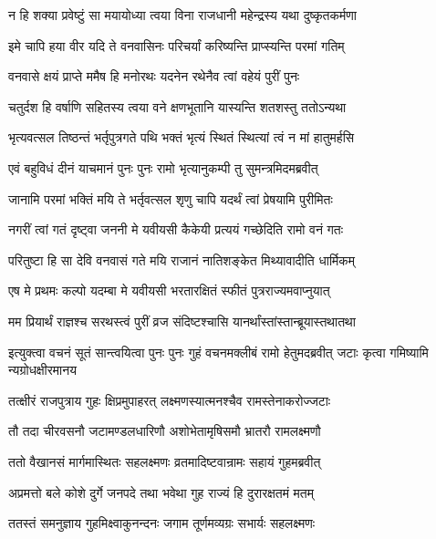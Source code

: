 \twolineshloka
{न हि शक्या प्रवेष्टुं सा मयायोध्या त्वया विना}
{राजधानी महेन्द्रस्य यथा दुष्कृतकर्मणा} %

\twolineshloka
{इमे चापि हया वीर यदि ते वनवासिनः}
{परिचर्यां करिष्यन्ति प्राप्स्यन्ति परमां गतिम्} %

\twolineshloka
{वनवासे क्षयं प्राप्ते ममैष हि मनोरथः}
{यदनेन रथेनैव त्वां वहेयं पुरीं पुनः} %

\twolineshloka
{चतुर्दश हि वर्षाणि सहितस्य त्वया वने}
{क्षणभूतानि यास्यन्ति शतशस्तु ततोऽन्यथा} %

\twolineshloka
{भृत्यवत्सल तिष्ठन्तं भर्तृपुत्रगते पथि}
{भक्तं भृत्यं स्थितं स्थित्यां त्वं न मां हातुमर्हसि} %

\twolineshloka
{एवं बहुविधं दीनं याचमानं पुनः पुनः}
{रामो भृत्यानुकम्पी तु सुमन्त्रमिदमब्रवीत्} %

\twolineshloka
{जानामि परमां भक्तिं मयि ते भर्तृवत्सल}
{शृणु चापि यदर्थं त्वां प्रेषयामि पुरीमितः} %

\twolineshloka
{नगरीं त्वां गतं दृष्ट्वा जननी मे यवीयसी}
{कैकेयी प्रत्ययं गच्छेदिति रामो वनं गतः} %

\twolineshloka
{परितुष्टा हि सा देवि वनवासं गते मयि}
{राजानं नातिशङ्केत मिथ्यावादीति धार्मिकम्} %

\twolineshloka
{एष मे प्रथमः कल्पो यदम्बा मे यवीयसी}
{भरतारक्षितं स्फीतं पुत्रराज्यमवाप्नुयात्} %

\twolineshloka
{मम प्रियार्थं राज्ञश्च सरथस्त्वं पुरीं व्रज}
{संदिष्टश्चासि यानर्थांस्तांस्तान्ब्रूयास्तथातथा} %

\threelineshloka
{इत्युक्त्वा वचनं सूतं सान्त्वयित्वा पुनः पुनः}
{गुहं वचनमक्लीबं रामो हेतुमदब्रवीत्}
{जटाः कृत्वा गमिष्यामि न्यग्रोधक्षीरमानय} %

\twolineshloka
{तत्क्षीरं राजपुत्राय गुहः क्षिप्रमुपाहरत्}
{लक्ष्मणस्यात्मनश्चैव रामस्तेनाकरोज्जटाः} %

\twolineshloka
{तौ तदा चीरवसनौ जटामण्डलधारिणौ}
{अशोभेतामृषिसमौ भ्रातरौ रामलक्ष्मणौ} %

\twolineshloka
{ततो वैखानसं मार्गमास्थितः सहलक्ष्मणः}
{व्रतमादिष्टवान्रामः सहायं गुहमब्रवीत्} %

\twolineshloka
{अप्रमत्तो बले कोशे दुर्गे जनपदे तथा}
{भवेथा गुह राज्यं हि दुरारक्षतमं मतम्} %

\twolineshloka
{ततस्तं समनुज्ञाय गुहमिक्ष्वाकुनन्दनः}
{जगाम तूर्णमव्यग्रः सभार्यः सहलक्ष्मणः} %


